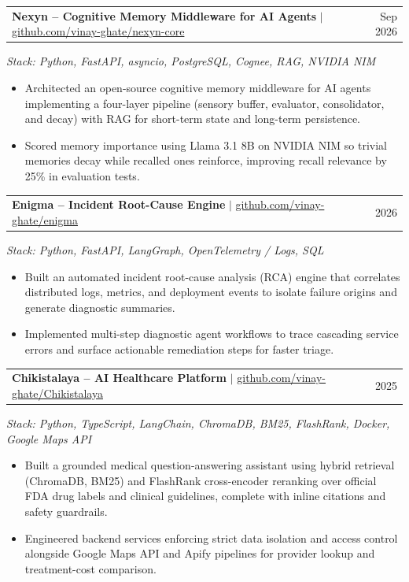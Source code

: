 \documentclass[a4paper,10.5pt]{article}
\makeatletter
\newcommand{\resumeProjectHeading}[2]{
  \item
  \begin{tabular*}{0.98\textwidth}{l@{\extracolsep{\fill}}r}
    \small#1 & \small#2 \\
  \end{tabular*}\vspace{-5pt}
}
\newcommand{\resumeItemListStart}{\begin{itemize}[leftmargin=0.15in]}
\newcommand{\resumeItemListEnd}{\end{itemize}\vspace{-3pt}}
\makeatother
\begin{document}
\resumeProjectHeading
  {\textbf{Nexyn -- Cognitive Memory Middleware for AI Agents} $|$ \href{https://github.com/vinay-ghate/nexyn-core}{github.com/vinay-ghate/nexyn-core}}
  {Sep 2026}
\vspace{-4pt}
\item\small{\emph{Stack: Python, FastAPI, asyncio, PostgreSQL, Cognee, RAG, NVIDIA NIM}}
\resumeItemListStart
  \item\small{Architected an open-source cognitive memory middleware for AI agents implementing a four-layer pipeline (sensory buffer, evaluator, consolidator, and decay) with RAG for short-term state and long-term persistence.}
  \item\small{Scored memory importance using Llama 3.1 8B on NVIDIA NIM so trivial memories decay while recalled ones reinforce, improving recall relevance by 25\% in evaluation tests.}
\resumeItemListEnd

\resumeProjectHeading
  {\textbf{Enigma -- Incident Root-Cause Engine} $|$ \href{https://github.com/vinay-ghate/enigma}{github.com/vinay-ghate/enigma}}
  {2026}
\vspace{-4pt}
\item\small{\emph{Stack: Python, FastAPI, LangGraph, OpenTelemetry / Logs, SQL}}
\resumeItemListStart
  \item\small{Built an automated incident root-cause analysis (RCA) engine that correlates distributed logs, metrics, and deployment events to isolate failure origins and generate diagnostic summaries.}
  \item\small{Implemented multi-step diagnostic agent workflows to trace cascading service errors and surface actionable remediation steps for faster triage.}
\resumeItemListEnd

\resumeProjectHeading
  {\textbf{Chikistalaya -- AI Healthcare Platform} $|$ \href{https://github.com/vinay-ghate/Chikistalaya}{github.com/vinay-ghate/Chikistalaya}}
  {2025}
\vspace{-4pt}
\item\small{\emph{Stack: Python, TypeScript, LangChain, ChromaDB, BM25, FlashRank, Docker, Google Maps API}}
\resumeItemListStart
  \item\small{Built a grounded medical question-answering assistant using hybrid retrieval (ChromaDB, BM25) and FlashRank cross-encoder reranking over official FDA drug labels and clinical guidelines, complete with inline citations and safety guardrails.}
  \item\small{Engineered backend services enforcing strict data isolation and access control alongside Google Maps API and Apify pipelines for provider lookup and treatment-cost comparison.}
\resumeItemListEnd
\end{document}
